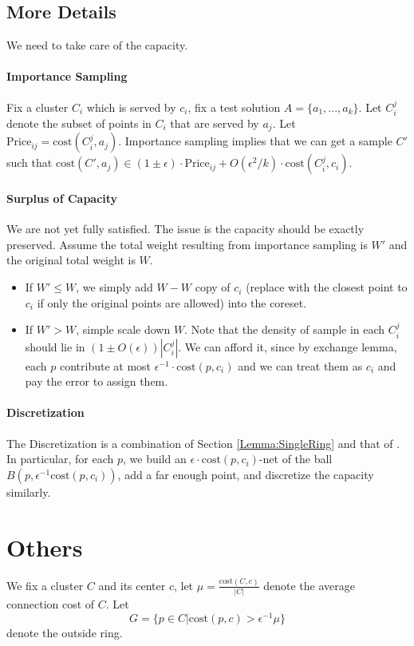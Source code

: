 \subsection{More Details}
We need to take care of the capacity.
\paragraph{Importance Sampling} Fix a cluster $C_i$ which is served by $c_i$, fix a test solution $A=\{a_1,...,a_k\}$. Let $C_i^j$ denote the subset of points in $C_i$ that are served by $a_j$. Let $\mathrm{Price}_{ij}=\mathrm{cost}(C_i^j,a_j)$. Importance sampling implies that we can get a sample $C'$ such that $\mathrm{cost}(C',a_j)\in (1\pm\epsilon)\cdot \mathrm{Price}_{ij}+O(\epsilon^2/k)\cdot \mathrm{cost}(C_i^j,c_i)$.

\paragraph{Surplus of Capacity} We are not yet fully satisfied. The issue is the capacity should be exactly preserved. Assume the total weight resulting from importance sampling is $W'$ and the original total weight is $W$.
\begin{itemize}
    \item If $W'\leq W$, we simply add $W-W$ copy of $c_i$ (replace with the closest point to $c_i$ if only the original points are allowed) into the coreset.
    \item If $W'>W$, simple scale down $W$. Note that the density of sample in each $C_i^j$ should lie in $(1\pm O(\epsilon))|C_i^j|$. We can afford it, since by exchange lemma, each $p$ contribute at most $\epsilon^{-1}\cdot \mathrm{cost}(p,c_i)$ and we can treat them as $c_i$ and pay the error to assign them.
\end{itemize}

\paragraph{Discretization}
The Discretization is a combination of Section \ref{Lemma:SingleRing} and that of \cite{cohen2021new}. In particular, for each $p$, we build an $\epsilon\cdot \mathrm{cost}(p,c_i)$-net of the ball $B(p,\epsilon^{-1}\mathrm{cost}(p,c_i))$, add a far enough point, and discretize the capacity similarly.

\section{Others}
We fix a cluster $C$ and its center $c$, let $\mu=\frac{\mathrm{cost}(C,c)}{|C|}$ denote the average connection cost of $C$. Let $$
G=\{p\in C|\mathrm{cost}(p,c)>\epsilon^{-1}\mu\}
$$
denote the outside ring.

